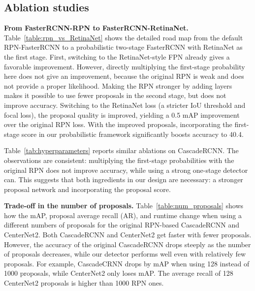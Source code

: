 \documentclass{article}
\renewcommand{\paragraph}[1]{\noindent\textbf{#1}}
\begin{document}
\subsection{Ablation studies}
\label{sec:ablation}
\paragraph{From FasterRCNN-RPN to FasterRCNN-RetinaNet.}
Table~\ref{table:rpn_vs_RetinaNet} shows the detailed road map from the default RPN-FasterRCNN to a probabilistic two-stage FasterRCNN with RetinaNet as the first stage.
First, switching to the RetinaNet-style FPN already gives a favorable improvement.
However, directly multiplying the first-stage probability here does not give an improvement, because the original RPN is weak and does not provide a proper likelihood.
Making the RPN stronger by adding layers makes it possible to use fewer proposals in the second stage, but does not improve accuracy.
Switching to the RetinaNet loss (a stricter IoU threshold and focal loss), the proposal quality is improved, yielding a 0.5 mAP improvement over the original RPN loss.
With the improved proposals, incorporating the first-stage score in our probabilistic framework significantly boosts accuracy to 40.4. 

Table~\ref{tab:hyperparameters} reports similar ablations on CascadeRCNN.
The observations are consistent: multiplying the first-stage probabilities with the original RPN does not improve accuracy, while using a strong one-stage detector can.
This suggests that both ingredients in our design are necessary: a stronger proposal network and incorporating the proposal score.

\paragraph{Trade-off in the number of proposals.}
Table~\ref{table:num_proposals} shows how the mAP, proposal average recall (AR), and runtime change when using a different numbers of proposals for the original RPN-based CascadeRCNN and CenterNet2.
Both CascadeRCNN and CenterNet2 get faster with fewer proposals.
However, the accuracy of the original CascadeRCNN drops steeply as the number of proposals decreases, while our detector performs well even with relatively few proposals.
For example, CascadeCRNN drops by  mAP when using 128 instead of 1000 proposals, while CenterNet2 only loses  mAP.
The average recall of 128 CenterNet2 proposals is higher than 1000 RPN ones.
\end{document}
